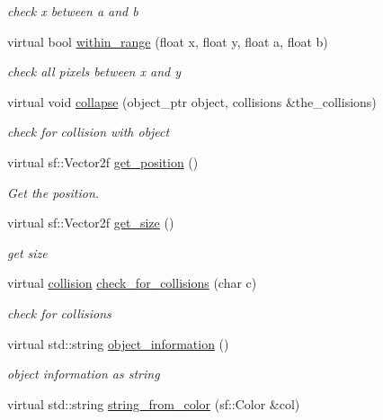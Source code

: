\begin{DoxyCompactItemize}
\begin{DoxyCompactList}\small\item\em check x between a and b \end{DoxyCompactList}\item 
virtual bool \hyperlink{classdrawable_ab5c0e1af885f214bc9ef0da47cdb5ac9}{within\+\_\+range} (float x, float y, float a, float b)
\begin{DoxyCompactList}\small\item\em check all pixels between x and y \end{DoxyCompactList}\item 
virtual void \hyperlink{classdrawable_af0ddd3660d258629598dc76b31d1cc49}{collapse} (object\+\_\+ptr object, collisions \&the\+\_\+collisions)
\begin{DoxyCompactList}\small\item\em check for collision with object \end{DoxyCompactList}\item 
virtual sf\+::\+Vector2f \hyperlink{classdrawable_a6a31ea381be2964d0115b782a66d3414}{get\+\_\+position} ()
\begin{DoxyCompactList}\small\item\em Get the position. \end{DoxyCompactList}\item 
virtual sf\+::\+Vector2f \hyperlink{classdrawable_a58cb3ab0406d40e9cea3aefac1e4bf05}{get\+\_\+size} ()
\begin{DoxyCompactList}\small\item\em get size \end{DoxyCompactList}\item 
virtual \hyperlink{structcollision}{collision} \hyperlink{classdrawable_abbc6e0089d502ba48c3fcb9c96e3966e}{check\+\_\+for\+\_\+collisions} (char c)
\begin{DoxyCompactList}\small\item\em check for collisions \end{DoxyCompactList}\item 
virtual std\+::string \hyperlink{classdrawable_a2ed0f8bb53f33477f7722efa7bb24583}{object\+\_\+information} ()
\begin{DoxyCompactList}\small\item\em object information as string \end{DoxyCompactList}\item 
virtual std\+::string \hyperlink{classdrawable_add3d8569fe2616ae0ed503b19c92c08e}{string\+\_\+from\+\_\+color} (sf\+::\+Color \&col)

\end{DoxyCompactItemize}
